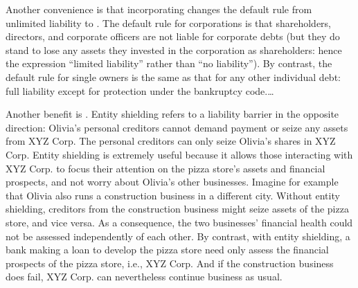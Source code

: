 Another convenience is that incorporating changes the default rule from
unlimited liability to . The default rule for
corporations is that shareholders, directors, and corporate officers are not
liable for corporate debts (but they do stand to lose any assets they invested
in the corporation as shareholders: hence the expression ``limited liability''
rather than ``no liability''). By contrast, the default rule for single owners
is the same as that for any other individual debt: full liability except for
protection under the bankruptcy code.\ldots

Another benefit is . Entity shielding refers to a
liability barrier in the opposite direction: Olivia's personal creditors cannot
demand payment or seize any assets from XYZ Corp. The personal creditors can
only seize Olivia's shares in XYZ Corp. Entity shielding is extremely useful
because it allows those interacting with XYZ Corp. to focus their attention on
the pizza store's assets and financial prospects, and not worry about Olivia's
other businesses. Imagine for example that Olivia also runs a construction
business in a different city. Without entity shielding, creditors from the
construction business might seize assets of the pizza store, and vice versa. As
a consequence, the two businesses' financial health could not be assessed
independently of each other. By contrast, with entity shielding, a bank making a
loan to develop the pizza store need only assess the financial prospects of the
pizza store, i.e., XYZ Corp. And if the construction business does fail, XYZ
Corp. can nevertheless continue business as usual.
